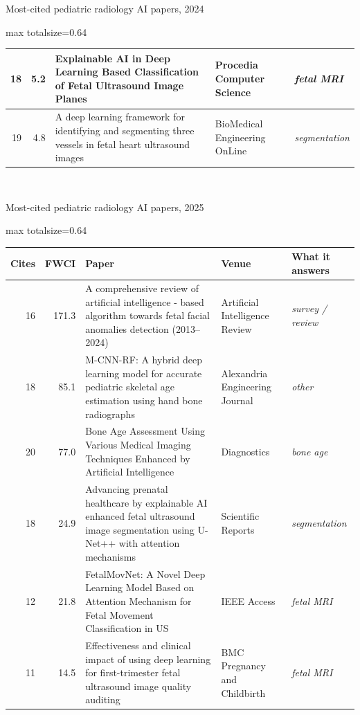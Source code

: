 \documentclass[aspectratio=169]{beamer}
\renewcommand{\arraystretch}{1.08}
\begin{document}
\begin{frame}[category=Journals/Preprints]{Most-cited pediatric radiology AI papers, 2024}
\begin{adjustbox}{max totalsize={\textwidth}{0.64\textheight}}
\begin{tabular}{|r|r|>{\raggedright\arraybackslash}p{}|>{\raggedright\arraybackslash}p{}|>{\raggedright\arraybackslash}p{}|}
18 & 5.2 & Explainable AI in Deep Learning Based Classification of Fetal Ultrasound Image Planes & Procedia Computer Science & \textit{fetal MRI} \\ \hline
19 & 4.8 & A deep learning framework for identifying and segmenting three vessels in fetal heart ultrasound images & BioMedical Engineering OnLine & \textit{segmentation} \\ \hline
\end{tabular}
\end{adjustbox}
\\[1pt]
{\tiny }
\end{frame}

\begin{frame}[category=Journals/Preprints]{Most-cited pediatric radiology AI papers, 2025}
\tiny
\begin{adjustbox}{max totalsize={\textwidth}{0.64\textheight}}
\renewcommand{\arraystretch}{1.2}
\begin{tabular}{|r|r|>{\raggedright\arraybackslash}p{}|>{\raggedright\arraybackslash}p{}|>{\raggedright\arraybackslash}p{}|}
\hline \textbf{Cites} & \textbf{FWCI} & \textbf{Paper} & \textbf{Venue} & \textbf{What it answers} \\ \hline
16 & 171.3 & A comprehensive review of artificial intelligence - based algorithm towards fetal facial anomalies detection (2013--2024) & Artificial Intelligence Review & \textit{survey / review} \\ \hline
18 & 85.1 & M-CNN-RF: A hybrid deep learning model for accurate pediatric skeletal age estimation using hand bone radiographs & Alexandria Engineering Journal & \textit{other} \\ \hline
20 & 77.0 & Bone Age Assessment Using Various Medical Imaging Techniques Enhanced by Artificial Intelligence & Diagnostics & \textit{bone age} \\ \hline
18 & 24.9 & Advancing prenatal healthcare by explainable AI enhanced fetal ultrasound image segmentation using U-Net++ with attention mechanisms & Scientific Reports & \textit{segmentation} \\ \hline
12 & 21.8 & FetalMovNet: A Novel Deep Learning Model Based on Attention Mechanism for Fetal Movement Classification in US & IEEE Access & \textit{fetal MRI} \\ \hline
11 & 14.5 & Effectiveness and clinical impact of using deep learning for first-trimester fetal ultrasound image quality auditing & BMC Pregnancy and Childbirth & \textit{fetal MRI} \\ \hline

\end{tabular}
\end{adjustbox}
\end{frame}
\end{document}
